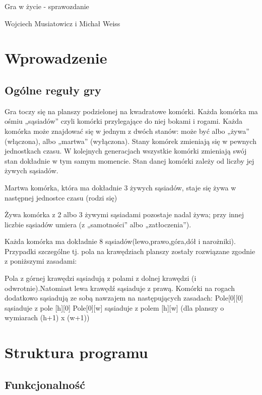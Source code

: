 \documentclass{article}
\begin{document}
\begin{Huge}
\begin{center}
Gra w życie - sprawozdanie
\end{center}
\end{Huge}
\begin{center}
{\Large Wojciech Musiatowicz i Michał Weiss}
\end{center}

\section{Wprowadzenie}
\subsection*{Ogólne reguły gry}


Gra toczy się na  planszy podzielonej na kwadratowe komórki. Każda komórka ma
ośmiu „sąsiadów” czyli komórki przylegające do niej bokami i rogami. Każda komórka może
znajdować się w jednym z dwóch stanów: może być albo „żywa” (włączona), albo „martwa”
(wyłączona). Stany komórek zmieniają się w pewnych jednostkach czasu. W kolejnych generacjach wszystkie komórki zmieniają swój stan dokładnie w tym samym
momencie. Stan danej komórki zależy od liczby jej żywych sąsiadów.

Martwa komórka, która ma dokładnie 3 żywych sąsiadów, staje się żywa w następnej jednostce
czasu (rodzi się)

Żywa komórka z 2 albo 3 żywymi sąsiadami pozostaje nadal żywa; przy innej liczbie sąsiadów
umiera (z „samotności” albo „zatłoczenia”).

Każda komórka ma dokładnie 8 sąsiadów(lewo,prawo,góra,dół i narożniki). Przypadki szczególne tj. pola na krawędziach planszy zostały rozwiązane zgodnie z poniższymi zasadami:

Pola z górnej krawędzi sąsiadują z polami z dolnej krawędzi (i odwrotnie).Natomiast lewa krawędź sąsiaduje z prawą. Komórki na rogach dodatkowo sąsiadują ze sobą nawzajem na następujących zasadach: 
Pole[0][0] sąsiaduje z pole [h][0]
Pole[0][w] sąsiaduje z polem [h][w]
(dla planszy o wymiarach (h+1) x (w+1))
\section{Struktura programu}
\subsection*{Funkcjonalność}
\end{document}
